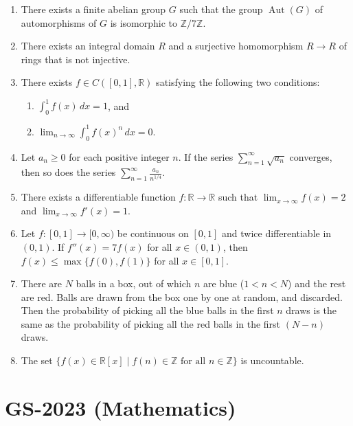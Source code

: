 \documentclass[11pt, a4paper]{article}
\begin{document}
\begin{enumerate}
  \item There exists a finite abelian group $G$ such that the group $\operatorname{Aut}(G)$ of automorphisms of $G$ is isomorphic to $\mathbb{Z}/7\mathbb{Z}$.
  \item There exists an integral domain $R$ and a surjective homomorphism $R \to R$ of rings that is not injective.
  \item There exists $f \in C([0,1], \mathbb{R})$ satisfying the following two conditions:
  \begin{enumerate}[label=(\roman*)]
    \item $\int_0^1 f(x)\,dx = 1$, and
    \item $\lim_{n \to \infty} \int_0^1 f(x)^n\,dx = 0$.
  \end{enumerate}
  \item Let $a_n \ge 0$ for each positive integer $n$. If the series $\sum_{n=1}^\infty \sqrt{a_n}$ converges, then so does the series $\sum_{n=1}^\infty \frac{a_n}{n^{1/4}}$.
  \item There exists a differentiable function $f: \mathbb{R} \to \mathbb{R}$ such that $\lim_{x \to \infty} f(x) = 2$ and $\lim_{x \to \infty} f'(x) = 1$.
  \item Let $f: [0,1] \to [0,\infty)$ be continuous on $[0,1]$ and twice differentiable in $(0,1)$. If $f''(x) = 7f(x)$ for all $x \in (0,1)$, then $f(x) \le \max\{f(0), f(1)\}$ for all $x \in [0,1]$.
  \item There are $N$ balls in a box, out of which $n$ are blue ($1 < n < N$) and the rest are red. Balls are drawn from the box one by one at random, and discarded. Then the probability of picking all the blue balls in the first $n$ draws is the same as the probability of picking all the red balls in the first $(N - n)$ draws.
  \item The set $\{f(x) \in \mathbb{R}[x] \mid f(n) \in \mathbb{Z} \text{ for all } n \in \mathbb{Z}\}$ is uncountable.
\end{enumerate}

\newpage

\section{GS-2023 (Mathematics)}
\end{document}
